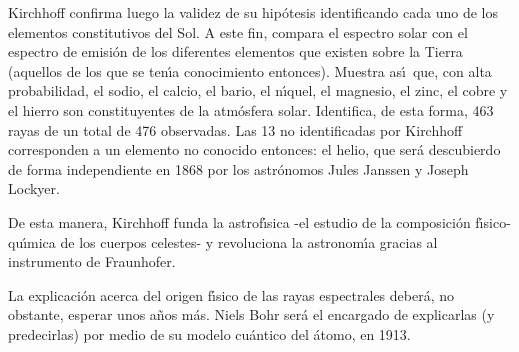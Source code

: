 \documentclass{article}
\begin{document}
Kirchhoff confirma luego la validez de su hip\'otesis identificando cada uno
de los elementos constitutivos del Sol. A este fin, compara el espectro solar
con el espectro de emisi\'on de los diferentes elementos que existen sobre la
Tierra (aquellos de los que se ten\'\i a conocimiento entonces). Muestra 
as\'\i\  que, con alta probabilidad, el sodio, el calcio, el bario, el 
n\'\i quel, el magnesio, el zinc, el cobre y el hierro son constituyentes de
la atm\'osfera solar. Identifica, de esta forma, 463 rayas de un total de 
476 observadas. Las 13 no identificadas por Kirchhoff corresponden a un 
elemento no conocido entonces: el helio, que ser\'a descubierdo de forma 
independiente en 1868 por los astr\'onomos Jules Janssen y Joseph Lockyer.

De esta manera, Kirchhoff funda la astrof\'\i sica -el estudio de la 
composici\'on f\'\i sico-qu\'\i mica de los cuerpos celestes- y revoluciona
la astronom\'\i a gracias al instrumento de Fraunhofer. 

La explicaci\'on acerca del origen f\'\i sico
de las rayas espectrales deber\'a, no obstante, esperar unos a\~nos m\'as.
Niels Bohr ser\'a el encargado de explicarlas (y predecirlas) por medio de
su modelo cu\'antico del \'atomo, en 1913.
\end{document}
